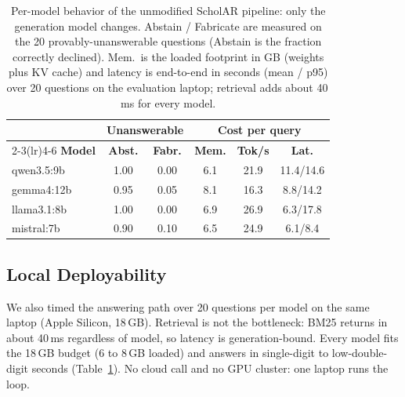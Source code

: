 \documentclass[letterpaper]{article} %
\begin{document}
\begin{table}[t]
  \centering
  \caption{Per-model behavior of the unmodified ScholAR pipeline: only the generation model
           changes. Abstain / Fabricate are measured on the 20 provably-unanswerable questions
           (Abstain is the fraction correctly declined). Mem.\ is the loaded footprint in GB
           (weights plus KV cache) and latency is end-to-end in seconds (mean / p95) over 20
           questions on the evaluation laptop; retrieval adds about 40\,ms for every model.}
  \label{tab:permodel}
  \setlength{\tabcolsep}{3pt}
  \begin{tabular}{lccccc}
    \toprule
    & \multicolumn{2}{c}{\textbf{Unanswerable}} & \multicolumn{3}{c}{\textbf{Cost per query}} \\
    \cmidrule(lr){2-3}\cmidrule(lr){4-6}
    \textbf{Model} & \textbf{Abst.} & \textbf{Fabr.} & \textbf{Mem.} & \textbf{Tok/s} & \textbf{Lat.} \\
    \midrule
    qwen3.5:9b   & 1.00 & 0.00 & 6.1 & 21.9 & 11.4/14.6 \\
    gemma4:12b   & 0.95 & 0.05 & 8.1 & 16.3 & 8.8/14.2 \\
    llama3.1:8b  & 1.00 & 0.00 & 6.9 & 26.9 & 6.3/17.8 \\
    mistral:7b   & 0.90 & 0.10 & 6.5 & 24.9 & 6.1/8.4 \\
    \bottomrule
  \end{tabular}
\end{table}


\subsection{Local Deployability}
\label{sec:efficiency}
We also timed the answering path over 20 questions per model on the same laptop (Apple Silicon,
18\,GB). Retrieval is not the bottleneck: BM25 returns in about 40\,ms regardless of model, so
latency is generation-bound. Every model fits the 18\,GB budget (6 to 8\,GB loaded) and answers
in single-digit to low-double-digit seconds (Table~\ref{tab:permodel}). No cloud call and no GPU
cluster: one laptop runs the loop.

\end{document}
